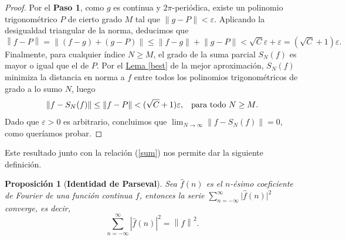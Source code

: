 \documentclass[12pt]{article}
\theoremstyle{plain}
\newtheorem{proposicion}[teorema]{Proposición}
\theoremstyle{definition}
\numberwithin{equation}{section}
\begin{document}
\begin{proof}
                Por el \textbf{Paso 1}, como \(g\) es continua y \(2\pi\)-periódica, existe un polinomio trigonométrico \(P\) de cierto grado \(M\) tal que \(\left\lVert g - P\right\rVert < \varepsilon\). Aplicando la desigualdad triangular de la norma, deducimos que
                \begin{equation*}
                    \left\lVert f - P\right\rVert = \left\lVert (f - g) + (g - P)\right\rVert \leq \left\lVert f - g\right\rVert + \left\lVert g - P\right\rVert < \sqrt{C}\varepsilon + \varepsilon = (\sqrt{C} + 1)\varepsilon.
                \end{equation*}
                Finalmente, para cualquier índice \(N \geq M\), el grado de la suma parcial \(S_N(f)\) es mayor o igual que el de \(P\). Por el \hyperref[best]{Lema \ref*{best}} de la mejor aproximación, \(S_N(f)\) minimiza la distancia en norma a \(f\) entre todos los polinomios trigonométricos de grado a lo sumo \(N\), luego
                \begin{equation*}
                    \left\lVert f - S_N(f)\right\rVert \leq \left\lVert f - P\right\rVert < (\sqrt{C} + 1)\varepsilon, \hspace{3mm} \text{para todo \(N \geq M\)}.
                \end{equation*}
                Dado que \(\varepsilon > 0\) es arbitrario, concluimos que \(\lim_{N \to \infty} \left\lVert f - S_N(f)\right\rVert = 0\), como queríamos probar.
            \end{proof}
            Este resultado junto con la relación (\ref{sum}) nos permite dar la siguiente definición. 
            \begin{proposicion}[\textbf{Identidad de Parseval}]
                Sea \(\hat{f}(n)\) es el \(n\)-ésimo coeficiente de Fourier de una función continua \(f\), entonces la serie \(\sum_{n = -\infty}^{\infty} \lvert \hat{f}(n)\rvert^2\) converge, es decir, $$\sum_{n = -\infty}^{\infty} \left\lvert \hat{f}(n)\right\rvert^2 = \left\lVert f\right\rVert^2.$$
            \end{proposicion}
\newpage
\end{document}
